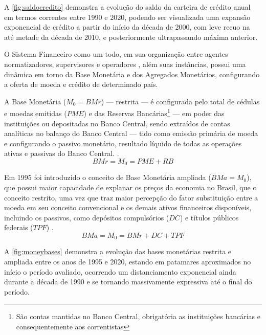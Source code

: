 \documentclass[12pt,12pt,openright,oneside,a4paper,chapter=TITLE,section=TITLE,subsection=TITLE,subsubsection=TITLE,english,french,spanish,portugues,sumario=tradicional]{abntex2}
\begin{document}
A \autoref{fig:saldocredito} demonstra a evolução do saldo da carteira de crédito anual em termos correntes entre 1990 e 2020, podendo ser visualizada uma expansão exponencial de crédito a partir do início da década de 2000, com leve recuo na até metade da década de 2010, e posteriormente ultrapassando máxima anterior.

O Sistema Financeiro como um todo, em sua organização entre agentes normatizadores, supervisores e operadores , além suas instâncias, possui uma dinâmica em torno da Base Monetária e dos Agregados Monetários, configurando a oferta de moeda e crédito de determinado país.

A Base Monetária (\(M_0 = BMr\)) --- restrita --- é configurada pelo total de cédulas e moedas emitidas (\(PME\)) e das Reservas Bancárias\footnote{São contas mantidas no Banco Central, obrigatória as instituições bancárias e consequentemente aos correntistas} --- em poder das instituições ou depositadas no Banco Central, sendo extraídos de contas analíticas no balanço do Banco Central --- tido como emissão primária de moeda e configurando o passivo monetário, resultado líquido de todas as operações ativas e passivas do Banco Central. \cite{bcb:2019}.
\[
BMr = M_0 = PME + RB
\]

Em 1995 foi introduzido o conceito de Base Monetária ampliada (\(BMa = M_0\)), que possui maior capacidade de explanar os preços da economia no Brasil, que o conceito restrito, uma vez que traz maior percepção do fator substituição entre a moeda em seu conceito convencional e os demais ativos financeiros disponíveis, incluindo os passivos, como depósitos compulsórios (\(DC\)) e títulos públicos federais (\(TPF\)) \cite{bcb:2019}.
\[
BMa = M_0 = BMr + DC+  TPF
\]

A \autoref{fig:moneybases} demonstra a evolução das bases monetárias restrita e ampliada entre os anos de 1995 e 2020, estando em patamares aproximados no início o período avaliado, ocorrendo um distanciamento exponencial ainda durante a década de 1990 e se tornando massivamente expressiva até o final do período.
\end{document}
